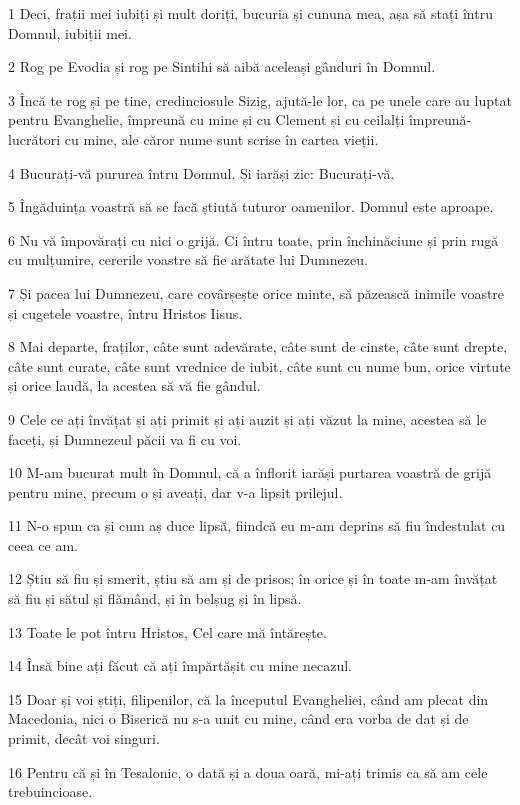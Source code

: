 \par 1 Deci, frații mei iubiți și mult doriți, bucuria și cununa mea, așa să stați întru Domnul, iubiții mei.
\par 2 Rog pe Evodia și rog pe Sintihi să aibă aceleași gânduri în Domnul.
\par 3 Încă te rog și pe tine, credinciosule Sizig, ajută-le lor, ca pe unele care au luptat pentru Evanghelie, împreună cu mine și cu Clement și cu ceilalți împreună-lucrători cu mine, ale căror nume sunt scrise în cartea vieții.
\par 4 Bucurați-vă pururea întru Domnul. Și iarăși zic: Bucurați-vă.
\par 5 Îngăduința voastră să se facă știută tuturor oamenilor. Domnul este aproape.
\par 6 Nu vă împovărați cu nici o grijă. Ci întru toate, prin închinăciune și prin rugă cu mulțumire, cererile voastre să fie arătate lui Dumnezeu.
\par 7 Și pacea lui Dumnezeu, care covârșește orice minte, să păzească inimile voastre și cugetele voastre, întru Hristos Iisus.
\par 8 Mai departe, fraților, câte sunt adevărate, câte sunt de cinste, câte sunt drepte, câte sunt curate, câte sunt vrednice de iubit, câte sunt cu nume bun, orice virtute și orice laudă, la acestea să vă fie gândul.
\par 9 Cele ce ați învățat și ați primit și ați auzit și ați văzut la mine, acestea să le faceți, și Dumnezeul păcii va fi cu voi.
\par 10 M-am bucurat mult în Domnul, că a înflorit iarăși purtarea voastră de grijă pentru mine, precum o și aveați, dar v-a lipsit prilejul.
\par 11 N-o spun ca și cum aș duce lipsă, fiindcă eu m-am deprins să fiu îndestulat cu ceea ce am.
\par 12 Știu să fiu și smerit, știu să am și de prisos; în orice și în toate m-am învățat să fiu și sătul și flămând, și în belșug și în lipsă.
\par 13 Toate le pot întru Hristos, Cel care mă întărește.
\par 14 Însă bine ați făcut că ați împărtășit cu mine necazul.
\par 15 Doar și voi știți, filipenilor, că la începutul Evangheliei, când am plecat din Macedonia, nici o Biserică nu s-a unit cu mine, când era vorba de dat și de primit, decât voi singuri.
\par 16 Pentru că și în Tesalonic, o dată și a doua oară, mi-ați trimis ca să am cele trebuincioase.
